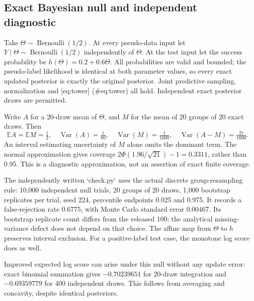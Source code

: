 \documentclass[10pt]{article}
\begin{document}
\subsection*{Exact Bayesian null and independent diagnostic}
Take \(\Theta\sim\operatorname{Bernoulli}(1/2)\). At every pseudo-data input let \(Y\mid\Theta\sim\operatorname{Bernoulli}(1/2)\) independently of \(\Theta\). At the test input let the success probability be \(h(\Theta)=0.2+0.6\Theta\). All probabilities are valid and bounded; the pseudo-label likelihood is identical at both parameter values, so every exact updated posterior is exactly the original posterior. Joint predictive sampling, normalization and [eq:tower] (\#eq:tower) all hold. Independent exact posterior draws are permitted.\par
Write \(A\) for a 20-draw mean of \(\Theta\), and \(M\) for the mean of 20 groups of 20 exact draws. Then \[\mathbb EA=\mathbb EM=\tfrac12,\quad
\operatorname{Var}(A)=\tfrac1{80},\quad
\operatorname{Var}(M)=\tfrac1{1600},\quad
\operatorname{Var}(A-M)=\tfrac{21}{1600}.\] An interval estimating uncertainty of \(M\) alone omits the dominant term. The normal approximation gives coverage \(2\Phi(1.96/\sqrt{21})-1=0.3311\), rather than 0.95. This is a diagnostic approximation, not an assertion of exact finite coverage.\par
The independently written `check.py` uses the actual discrete group-resampling rule: 10,000 independent null trials, 20 groups of 20 draws, 1,000 bootstrap replicates per trial, seed 224, percentile endpoints 0.025 and 0.975. It records a false-rejection rate \(0.6775\), with Monte Carlo standard error \(0.00467\). Its bootstrap replicate count differs from the released 100; the analytical missing-variance defect does not depend on that choice. The affine map from \(\Theta\) to \(h\) preserves interval exclusion. For a positive-label test case, the monotone log score does as well.\par
Improved expected log score can arise under this null without any update error: exact binomial summation gives \(-0.70239651\) for 20-draw integration and \(-0.69359779\) for 400 independent draws. This follows from averaging and concavity, despite identical posteriors.\par
\end{document}
